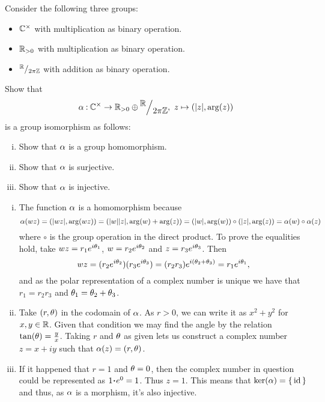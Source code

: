 \documentclass[12pt]{memoir}
\begin{document}
\begin{Ej}
    Consider the following three groups:
    \begin{itemize}
        \itemsep=-0.4em
        \item $\mathbb{C}^\times$ with multiplication as binary operation.
        \item $\mathbb{R}_{>0}$ with multiplication as binary operation.
        \item $\quot{\bR}{2\pi\bZ}$ with addition as binary operation.
    \end{itemize}
    Show that 
    $$\al\: \bC^\x\to \bR_{>0}\oplus\quot{\bR}{2\pi\bZ},\ z\mapsto(|z|,\arg(z))$$
    is a group isomorphism as follows:
    \begin{enumerate}[i)]
        \itemsep=-0.4em
        \item Show that $\alpha$ is a group homomorphism. 
        \item Show that $\alpha$ is surjective. 
        \item Show that $\alpha$ is injective. 
    \end{enumerate}
\end{Ej}

\begin{ptcbr}
    \begin{enumerate}[i)]
        \itemsep=-0.4em
        \item The function $\alpha$ is a homomorphism because 
        $$\alpha(wz)=(|wz|,\arg(wz))=(|w||z|,\arg(w)+\arg(z))=(|w|,\arg(w))\circ(|z|,\arg(z))=\alpha(w)\circ\alpha(z)$$
        where $\circ$ is the group operation in the direct product. To prove the equalities hold, take $wz=r_1e^{i\theta_1}$, $w=r_2e^{i\theta_2}$ and $z=r_3e^{i\theta_3}$. Then 
        $$wz=(r_2e^{i\theta_2})(r_3e^{i\theta_3})=(r_2r_3)e^{i(\theta_2+\theta_3)}=r_1e^{i\theta_1},$$
        and as the polar representation of a complex number is unique we have that $r_1=r_2r_3$ and $\theta_1=\theta_2+\theta_3$.
        \item Take $(r,\theta)$ in the codomain of $\alpha$. As $r>0$, we can write it as $x^2+y^2$ for $x,y\in\mathbb{R}$. Given that condition we may find the angle by the relation $\tan(\theta)=\frac{y}{x}$. Taking $r$ and $\theta$ as given lets us construct a complex number $z=x+iy$ such that $\alpha(z)=(r,\theta)$.
        \item If it happened that $r=1$ and $\theta=0$, then the complex number in question could be represented as $1\.e^0=1$. Thus $z=1$. This means that $\ker(\alpha)=\{\,\operatorname{id}\,\}$ and thus, as $\alpha$ is a morphism, it's also injective.
    \end{enumerate}
\end{ptcbr}
\ifx\nextra\undefined
\printindex
\else\fi
\nocite{*}


\end{document}
